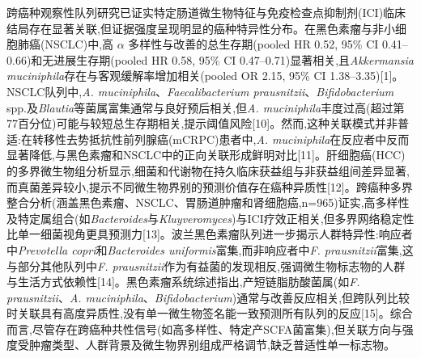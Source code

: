 跨癌种观察性队列研究已证实特定肠道微生物特征与免疫检查点抑制剂(ICI)临床结局存在显著关联,但证据强度呈现明显的癌种特异性分布。在黑色素瘤与非小细胞肺癌(NSCLC)中,高 \(\alpha\) 多样性与改善的总生存期(pooled HR 0.52, 95\% CI 0.41--0.66)和无进展生存期(pooled HR 0.58, 95\% CI 0.47--0.71)显著相关,且\emph{Akkermansia muciniphila}存在与客观缓解率增加相关(pooled OR 2.15, 95\% CI 1.38--3.35){[}1{]}。NSCLC队列中,\emph{A. muciniphila}、\emph{Faecalibacterium prausnitzii}、\emph{Bifidobacterium} spp.及\emph{Blautia}等菌属富集通常与良好预后相关,但\emph{A. muciniphila}丰度过高(超过第77百分位)可能与较短总生存期相关,提示阈值风险{[}10{]}。然而,这种关联模式并非普适:在转移性去势抵抗性前列腺癌(mCRPC)患者中,\emph{A. muciniphila}在反应者中反而显著降低,与黑色素瘤和NSCLC中的正向关联形成鲜明对比{[}11{]}。肝细胞癌(HCC)的多界微生物组分析显示,细菌和代谢物在持久临床获益组与非获益组间差异显著,而真菌差异较小,提示不同微生物界别的预测价值存在癌种异质性{[}12{]}。跨癌种多界整合分析(涵盖黑色素瘤、NSCLC、胃肠道肿瘤和肾细胞癌,n=965)证实,高多样性及特定属组合(如\emph{Bacteroides}与\emph{Kluyveromyces})与ICI疗效正相关,但多界网络稳定性比单一细菌视角更具预测力{[}13{]}。波兰黑色素瘤队列进一步揭示人群特异性:响应者中\emph{Prevotella copri}和\emph{Bacteroides uniformis}富集,而非响应者中\emph{F. prausnitzii}富集,这与部分其他队列中\emph{F. prausnitzii}作为有益菌的发现相反,强调微生物标志物的人群与生活方式依赖性{[}14{]}。黑色素瘤系统综述指出,产短链脂肪酸菌属(如\emph{F. prausnitzii}、\emph{A. muciniphila}、\emph{Bifidobacterium})通常与改善反应相关,但跨队列比较时关联具有高度异质性,没有单一微生物签名能一致预测所有队列的反应{[}15{]}。综合而言,尽管存在跨癌种共性信号(如高多样性、特定产SCFA菌富集),但关联方向与强度受肿瘤类型、人群背景及微生物界别组成严格调节,缺乏普适性单一标志物。

